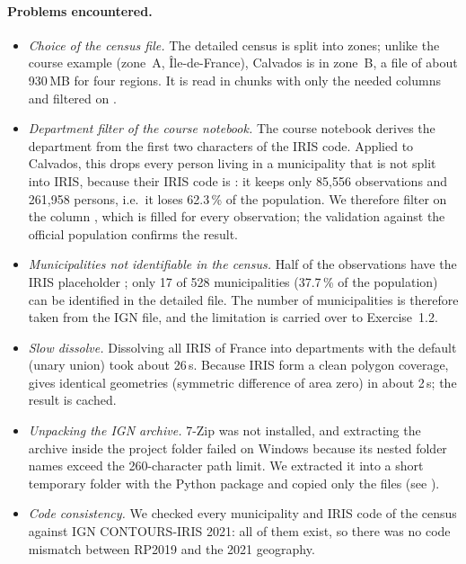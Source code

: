 \paragraph{Problems encountered.}
\begin{itemize}
  \item \emph{Choice of the census file.} The detailed census is split into zones; unlike the course example
  (zone~A, \^Ile-de-France), Calvados is in zone~B, a file of about 930\,MB for four regions. It is read in chunks with
  only the needed columns and filtered on .
  \item \emph{Department filter of the course notebook.} The course notebook derives the department from the first two
  characters of the IRIS code. Applied to Calvados, this drops every person living in a municipality that is not split
  into IRIS, because their IRIS code is : it keeps only 85{,}556 observations and 261{,}958 persons,
  i.e.\ it loses 62.3\,\% of the population. We therefore filter on the column , which is filled for every
  observation; the validation against the official population confirms the result.
  \item \emph{Municipalities not identifiable in the census.} Half of the observations have the IRIS placeholder
  ; only 17 of 528 municipalities (37.7\,\% of the population) can be identified in the detailed file.
  The number of municipalities is therefore taken from the IGN file, and the limitation is carried over to
  Exercise~1.2.
  \item \emph{Slow dissolve.} Dissolving all IRIS of France into departments with the default 
  (unary union) took about 26\,s. Because IRIS form a clean polygon coverage,  gives
  identical geometries (symmetric difference of area zero) in about 2\,s; the result is cached.
  \item \emph{Unpacking the IGN archive.} 7-Zip was not installed, and extracting the  archive inside the
  project folder failed on Windows because its nested folder names exceed the 260-character path limit. We extracted it
  into a short temporary folder with the Python package  and copied only the 
  files (see ).
  \item \emph{Code consistency.} We checked every municipality and IRIS code of the census against IGN
  CONTOURS-IRIS 2021: all of them exist, so there was no code mismatch between RP2019 and the 2021 geography.
\end{itemize}
